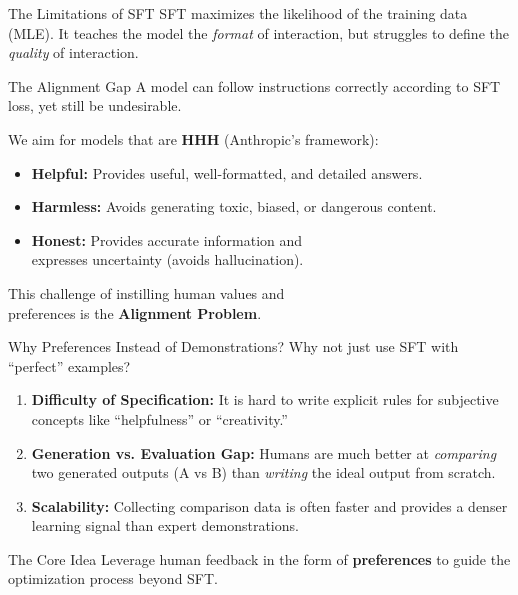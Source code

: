 \documentclass[xcolor=svgnames, 10pt, handout]{beamer}
\begin{document}
\begin{frame}{The Limitations of SFT}
    SFT maximizes the likelihood of the training data (MLE). It teaches the model the \textit{format} of interaction, but struggles to define the \textit{quality} of interaction.
    \pause

    \begin{block}{The Alignment Gap}
        A model can follow instructions correctly according to SFT loss, yet still be undesirable.
    \end{block}
    \pause

    We aim for models that are \textbf{HHH} (Anthropic's framework):
    \begin{itemize}
        \item \textbf{Helpful:} Provides useful, well-formatted, and detailed answers.
        \pause
        \item \textbf{Harmless:} Avoids generating toxic, biased, or dangerous content.
        \pause
        \item \textbf{Honest:} Provides accurate information and\\ expresses uncertainty (avoids hallucination).
    \end{itemize}
    \pause
    This challenge of instilling human values and\\ preferences is the \textbf{Alignment Problem}.

\end{frame}

\begin{frame}{Why Preferences Instead of Demonstrations?}
    Why not just use SFT with ``perfect'' examples?
    \pause
    \begin{enumerate}
        \item \textbf{Difficulty of Specification:} It is hard to write explicit rules for subjective concepts like ``helpfulness'' or ``creativity.''
        \pause
        \item \textbf{Generation vs. Evaluation Gap:} Humans are much better at \textit{comparing} two generated outputs (A vs B) than \textit{writing} the ideal output from scratch.
        \pause
        \item \textbf{Scalability:} Collecting comparison data is often faster and provides a denser learning signal than expert demonstrations.
    \end{enumerate}
    \pause
    \begin{block}{The Core Idea}
        Leverage human feedback in the form of \textbf{preferences} to guide the optimization process beyond SFT.
    \end{block}
\end{frame}
\end{document}
